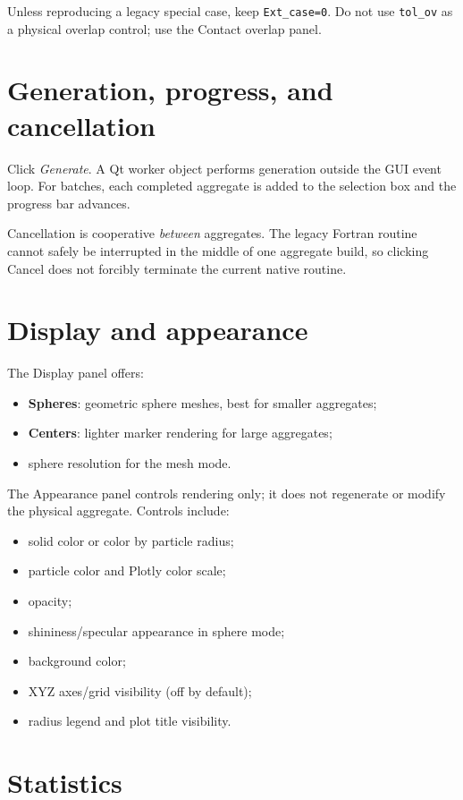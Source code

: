 \documentclass[11pt,oneside]{report}
\newcommand{\code}[1]{\texttt{#1}}
\begin{document}
Unless reproducing a legacy special case, keep \code{Ext\_case=0}. Do not use
\code{tol\_ov} as a physical overlap control; use the Contact overlap panel.

\section{Generation, progress, and cancellation}

Click \emph{Generate}. A Qt worker object performs generation outside the GUI
event loop. For batches, each completed aggregate is added to the selection box
and the progress bar advances.

Cancellation is cooperative \emph{between} aggregates. The legacy Fortran
routine cannot safely be interrupted in the middle of one aggregate build, so
clicking Cancel does not forcibly terminate the current native routine.

\section{Display and appearance}

The Display panel offers:
\begin{itemize}
  \item \textbf{Spheres}: geometric sphere meshes, best for smaller aggregates;
  \item \textbf{Centers}: lighter marker rendering for large aggregates;
  \item sphere resolution for the mesh mode.
\end{itemize}

The Appearance panel controls rendering only; it does not regenerate or modify
the physical aggregate. Controls include:
\begin{itemize}
  \item solid color or color by particle radius;
  \item particle color and Plotly color scale;
  \item opacity;
  \item shininess/specular appearance in sphere mode;
  \item background color;
  \item XYZ axes/grid visibility (off by default);
  \item radius legend and plot title visibility.
\end{itemize}

\section{Statistics}
\end{document}
